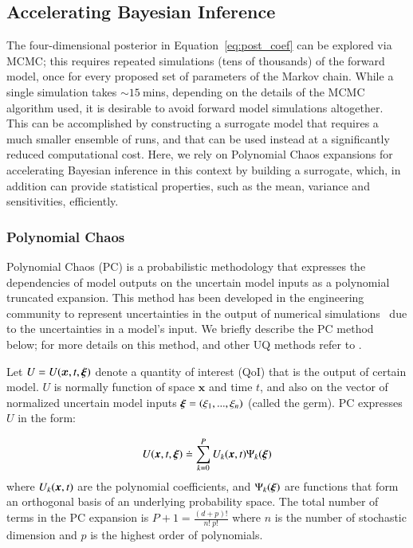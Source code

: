 \subsection{Accelerating Bayesian Inference}
\label{sec:uqpce}

The four-dimensional posterior in Equation~\eqref{eq:post_coef} can be explored via MCMC;
this requires repeated simulations (tens of thousands) of the forward \geoclaw model, 
once for every proposed set of parameters of the Markov chain. While a single \geoclaw simulation
takes $\sim 15~$mins, depending on the details of the MCMC algorithm used, it is desirable 
to avoid forward model simulations altogether. This can be accomplished by constructing a 
surrogate model that requires a much
smaller ensemble of \geoclaw runs, and that can be used instead
at a significantly reduced computational cost.  Here, we rely on
Polynomial Chaos expansions for accelerating Bayesian inference in this context 
by building a surrogate, which, in addition can provide statistical properties, such as the mean, variance and sensitivities, efficiently. 

\subsubsection{Polynomial Chaos}

Polynomial Chaos (PC) is a probabilistic methodology that expresses the 
dependencies of model outputs on the uncertain model inputs
as a polynomial truncated expansion. This method has been developed in 
the engineering community to represent uncertainties in the output of 
numerical simulations~\citep{Villegas2012,Lin2009,Xiu2004}
due to the uncertainties in a model's input. We briefly describe the PC
method below; for more details on this method, and other UQ methods
refer to \citep{LeMaitreKnio2010}.

Let $U=U(\bm{x},t,\xxi)$ denote a quantity of 
interest (QoI) that is the output of certain model.
$U$ is normally function of space $\bm{x}$ and time $t$, and 
also on the vector of normalized uncertain model inputs $\xxi=(\xi_1,...,\xi_n)$ (called the germ). 
PC expresses $U$ in the form:

\begin{equation}
  U(\xbold,t,\xxi) \doteq \sum_{k = 0}^P U_k(\xbold,t) \Psi_k(\xxi)
\label{eq:stochseries}
\end{equation} 
where $U_k(\xbold,t)$ are the polynomial coefficients, and
$\Psi_k(\xxi)$ are functions that form an orthogonal basis of an underlying probability
space. The total number of terms in the PC expansion is
$P+1 = \frac{(d+p)! }{n!\ p!}$ where $n$ is the number of stochastic dimension and $p$ is the highest order
of polynomials. 

